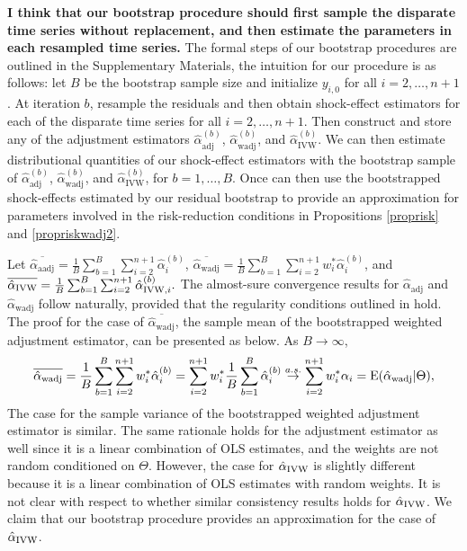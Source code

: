 \documentclass[11pt]{article}
\def\mrm#1{\mathrm{#1}} %
\def\E#1{\mathrm{E}(#1)} %
\theoremstyle{definition}
\begin{document}
\textbf{I think that our bootstrap procedure should first sample the disparate time series without replacement, and then estimate the parameters in each resampled time series.}
The formal steps of our bootstrap procedures are outlined in the Supplementary Materials, the intuition for our procedure is as follows: let $B$ be the bootstrap sample size and initialize $y_{i,0}$ for all $i = 2,\ldots,n+1$. At iteration $b$, resample the residuals and then obtain shock-effect estimators for each of the disparate time series for all $i = 2,\ldots,n+1$. Then construct and store any of the adjustment estimators $\hat{\alpha}^{(b)}_{\mrm{adj}}$, $\hat{\alpha}^{(b)}_{\mrm{wadj}}$, and $\hat{\alpha}^{(b)}_{\mrm{IVW}}$. We can then estimate distributional quantities of our shock-effect estimators with the bootstrap sample of $\hat{\alpha}^{(b)}_{\mrm{adj}}$, $\hat{\alpha}^{(b)}_{\mrm{wadj}}$, and $\hat{\alpha}^{(b)}_{\mrm{IVW}}$, for $b = 1,\ldots,B$.
Once can then use the bootstrapped shock-effects estimated by our residual bootstrap to provide an approximation for parameters involved in the risk-reduction conditions in Propositions \ref{proprisk} and \ref{propriskwadj2}.


Let 
$
  \overline{\hat{\alpha}_{\mrm{aadj}}} 
    = \frac{1}{B} \sum_{b=1}^B \sum_{i=2}^{n+1}\hat{\alpha}_i^{(b)}
$, 
$
  \overline{\hat{\alpha}_{\mrm{wadj}}} 
    = \frac{1}{B} \sum_{b=1}^B \sum_{i=2}^{n+1}w_i^* \hat{\alpha}_i^{(b)}
$, 
and 
$
  \overline{\hat{\alpha}_{\mrm{IVW}}} 
    = \frac{1}{B} \sum_{b=1}^B \sum_{i=2}^{n+1}\hat{\alpha}_{{\rm IVW}, i}^{(b)}.
$
The almost-sure convergence results for $\hat{\alpha}_{\mrm{adj}}$ and $\hat{\alpha}_{\mrm{wadj}}$ follow naturally, provided that the regularity conditions outlined in \citet{bose1988edgeworth} hold. The proof for the case of $\overline{\hat{\alpha}_{\mrm{wadj}}}$, the sample mean of the bootstrapped weighted adjustment estimator, can be presented as below. As $B \to \infty$,
\begin{align*}
  \overline{\hat{\alpha}_{\mrm{wadj}}}
  = \frac{1}{B} \sum_{b=1}^B \sum_{i=2}^{n+1}w_i^* \hat{\alpha}_i^{(b)}
  = \sum_{i=2}^{n+1}w_i^* \frac{1}{B} \sum_{b=1}^B\hat{\alpha}_i^{(b)}
  \overset{a.s.}{\rightarrow} \sum_{i=2}^{n+1}w_i^* \alpha_i 
  =\E{\hat{\alpha}_{\rm wadj}|\Theta},
\end{align*}
The case for the sample variance of the bootstrapped weighted adjustment estimator is similar. The same rationale holds for the adjustment estimator as well since it is a linear combination of OLS estimates, and the weights are not random conditioned on $\Theta$. However, the case for $\hat{\alpha}_{\rm IVW}$ is slightly different because it is a linear combination of OLS estimates with random weights. It is not clear with respect to whether similar consistency results holds for $\hat{\alpha}_{\rm IVW}$. We claim that our bootstrap procedure provides an approximation for the case of $\hat{\alpha}_{\rm IVW}$.
\end{document}
